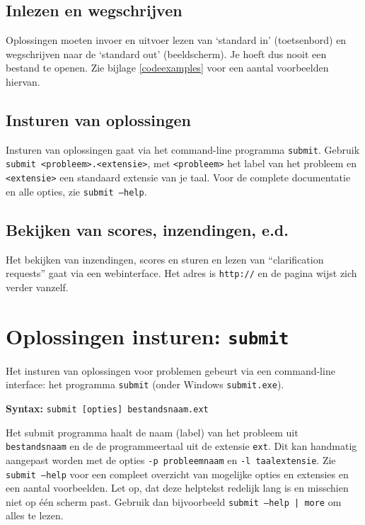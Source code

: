 \documentclass[11pt,a4paper]{article}
\newcommand{\url}[1]{\texttt{#1}}
\begin{document}
\subsection{Inlezen en wegschrijven}

Oplossingen moeten invoer en uitvoer lezen van `standard in'
(toetsenbord) en wegschrijven naar de `standard out' (beeldscherm).
Je hoeft dus nooit een bestand te openen. Zie bijlage
\ref{codeexamples} voor een aantal voorbeelden hiervan.

\subsection{Insturen van oplossingen}

Insturen van oplossingen gaat via het command-line programma
\texttt{submit}. Gebruik \texttt{submit <probleem>.<extensie>}, met
\texttt{<probleem>} het label van het probleem en \texttt{<extensie>}
een standaard extensie van je taal. Voor de complete documentatie en
alle opties, zie \texttt{submit --help}.

\subsection{Bekijken van scores, inzendingen, e.d.}

Het bekijken van inzendingen, scores en sturen en lezen van
``clarification requests'' gaat via een webinterface. Het adres is
\url{http://\WEBSERVER} en de pagina wijst zich verder vanzelf.

\newpage
\section{Oplossingen insturen: \texttt{submit}}\label{submit}

Het insturen van oplossingen voor problemen gebeurt via een
command-line interface: het programma \texttt{submit} (onder Windows
\texttt{submit.exe}).

\textbf{Syntax:} \texttt{submit [opties] bestandsnaam.ext}

Het submit programma haalt de naam (label) van het probleem uit
\texttt{bestandsnaam} en de de programmeertaal uit de extensie
\texttt{ext}. Dit kan handmatig aangepast worden met de opties
\texttt{-p probleemnaam} en \texttt{-l taalextensie}. Zie
\texttt{submit --help} voor een compleet overzicht van mogelijke
opties en extensies en een aantal voorbeelden. Let op, dat deze
helptekst redelijk lang is en misschien niet op \'e\'en scherm
past. Gebruik dan bijvoorbeeld \texttt{submit --help | more} om alles
te lezen.
\end{document}
